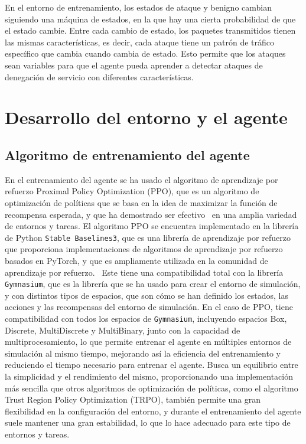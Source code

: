 En el entorno de entrenamiento, los estados de ataque y benigno cambian siguiendo una máquina de estados, en la que hay una cierta probabilidad de que el estado cambie. Entre cada cambio de estado, los paquetes transmitidos tienen las mismas características, es decir, cada ataque tiene un patrón de tráfico específico que cambia cuando cambia de estado. Esto permite que los ataques sean variables para que el agente pueda aprender a detectar ataques de denegación de servicio con diferentes características.

\section{Desarrollo del entorno y el agente}

\subsection{Algoritmo de entrenamiento del agente}
En el entrenamiento del agente se ha usado el algoritmo de aprendizaje por refuerzo Proximal Policy Optimization (PPO), que es un algoritmo de optimización de políticas que se basa en la idea de maximizar la función de recompensa esperada, y que ha demostrado ser efectivo~\cite{Siboo2023, Yu2022} en una amplia variedad de entornos y tareas.
El algoritmo PPO se encuentra implementado en la librería de Python \texttt{Stable Baselines3}, que es una librería de aprendizaje por refuerzo que proporciona implementaciones de algoritmos de aprendizaje por refuerzo basados en PyTorch, y que es ampliamente utilizada en la comunidad de aprendizaje por refuerzo.~\cite{Raffin2021}
Este tiene una compatibilidad total con la librería \texttt{Gymnasium}, que es la librería que se ha usado para crear el entorno de simulación, y con distintos tipos de espacios, que son cómo se han definido los estados, las acciones y las recompensas del entorno de simulación. En el caso de PPO, tiene compatibilidad con todos los espacios de \texttt{Gymnasium}, incluyendo espacios Box, Discrete, MultiDiscrete y MultiBinary, junto con la capacidad de multiprocesamiento, lo que permite entrenar el agente en múltiples entornos de simulación al mismo tiempo, mejorando así la eficiencia del entrenamiento y reduciendo el tiempo necesario para entrenar el agente.
Busca un equilibrio entre la simplicidad y el rendimiento del mismo, proporcionando una implementación más sencilla que otros algoritmos de optimización de políticas, como el algoritmo Trust Region Policy Optimization (TRPO), también permite una gran flexibilidad en la configuración del entorno, y durante el entrenamiento del agente suele mantener una gran estabilidad, lo que lo hace adecuado para este tipo de entornos y tareas.

